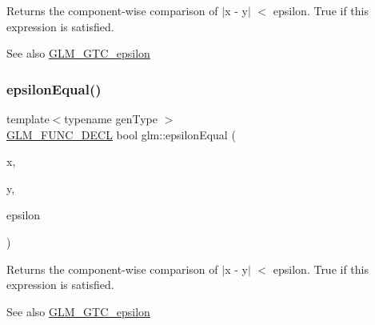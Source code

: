 Returns the component-\/wise comparison of $\vert$x -\/ y$\vert$ $<$ epsilon. True if this expression is satisfied.

\begin{DoxySeeAlso}{See also}
\mbox{\hyperlink{group__gtc__epsilon}{G\+L\+M\+\_\+\+G\+T\+C\+\_\+epsilon}} 
\end{DoxySeeAlso}
\mbox{\label{group__gtc__epsilon_gaa7f227999ca09e7ca994e8b35aba47bb}} 
\subsubsection{\texorpdfstring{epsilon\+Equal()}{epsilonEqual()}\hspace{0.1cm}{\footnotesize\ttfamily [2/2]}}
{\footnotesize\ttfamily template$<$typename gen\+Type $>$ \\
\mbox{\hyperlink{setup_8hpp_ab2d052de21a70539923e9bcbf6e83a51}{G\+L\+M\+\_\+\+F\+U\+N\+C\+\_\+\+D\+E\+CL}} bool glm\+::epsilon\+Equal (\begin{DoxyParamCaption}\item[{gen\+Type const \&}]{x,  }\item[{gen\+Type const \&}]{y,  }\item[{gen\+Type const \&}]{epsilon }\end{DoxyParamCaption})}

Returns the component-\/wise comparison of $\vert$x -\/ y$\vert$ $<$ epsilon. True if this expression is satisfied.

\begin{DoxySeeAlso}{See also}
\mbox{\hyperlink{group__gtc__epsilon}{G\+L\+M\+\_\+\+G\+T\+C\+\_\+epsilon}} 
\end{DoxySeeAlso}
\mbox{\label{group__gtc__epsilon_gaf840d33b9a5261ec78dcd5125743b025}} 
